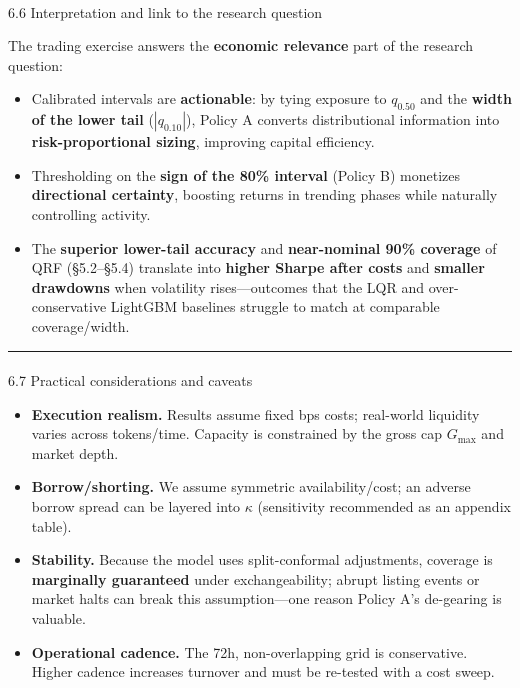 \documentclass[
  a4paper,
  DIV=11,
  numbers=noendperiod]{scrreprt}
\makeatletter
\let\oldparagraph\paragraph
\renewcommand{\paragraph}{
    \@ifstar
      \xxxParagraphStar
      \xxxParagraphNoStar
  }
\newcommand{\xxxParagraphStar}[1]{\oldparagraph*{#1}\mbox{}}
\newcommand{\xxxParagraphNoStar}[1]{\oldparagraph{#1}\mbox{}}
\providecommand{\tightlist}{%
  \setlength{\itemsep}{0pt}\setlength{\parskip}{0pt}}
\makeatother
\begin{document}
\paragraph{6.6 Interpretation and link to the research
question}\label{interpretation-and-link-to-the-research-question}

The trading exercise answers the \textbf{economic relevance} part of the
research question:

\begin{itemize}
\tightlist
\item
  Calibrated intervals are \textbf{actionable}: by tying exposure to
  \(q_{0.50}\) and the \textbf{width of the lower tail}
  (\(|q_{0.10}|\)), Policy A converts distributional information into
  \textbf{risk-proportional sizing}, improving capital efficiency.
\item
  Thresholding on the \textbf{sign of the 80\% interval} (Policy B)
  monetizes \textbf{directional certainty}, boosting returns in trending
  phases while naturally controlling activity.
\item
  The \textbf{superior lower-tail accuracy} and \textbf{near-nominal
  90\% coverage} of QRF (§5.2--§5.4) translate into \textbf{higher
  Sharpe after costs} and \textbf{smaller drawdowns} when volatility
  rises---outcomes that the LQR and over-conservative LightGBM baselines
  struggle to match at comparable coverage/width.
\end{itemize}

\begin{center}\rule{0.5\linewidth}{0.5pt}\end{center}

\paragraph{6.7 Practical considerations and
caveats}\label{practical-considerations-and-caveats}

\begin{itemize}
\tightlist
\item
  \textbf{Execution realism.} Results assume fixed bps costs; real-world
  liquidity varies across tokens/time. Capacity is constrained by the
  gross cap \(G_{\max}\) and market depth.
\item
  \textbf{Borrow/shorting.} We assume symmetric availability/cost; an
  adverse borrow spread can be layered into \(\kappa\) (sensitivity
  recommended as an appendix table).
\item
  \textbf{Stability.} Because the model uses split-conformal
  adjustments, coverage is \textbf{marginally guaranteed} under
  exchangeability; abrupt listing events or market halts can break this
  assumption---one reason Policy A's de-gearing is valuable.
\item
  \textbf{Operational cadence.} The 72h, non-overlapping grid is
  conservative. Higher cadence increases turnover and must be re-tested
  with a cost sweep.
\end{itemize}
\end{document}
